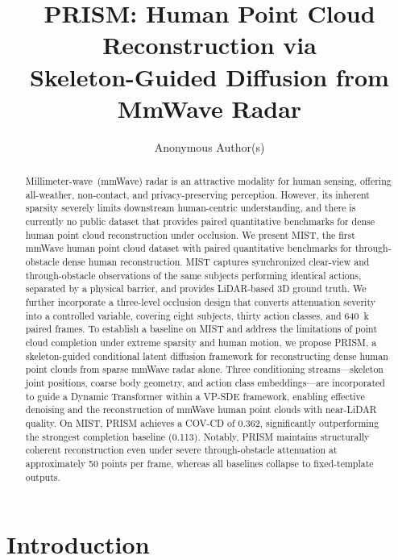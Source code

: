 \documentclass{article}
\title{\textcolor{prismblue}{PRISM}: Human \textcolor{prismblue}{P}oint Cloud \textcolor{prismblue}{R}econstruction v\textcolor{prismblue}{i}a \\
       \textcolor{prismblue}{S}keleton-Guided Diffusion from \textcolor{prismblue}{M}mWave Radar}
\author{Anonymous Author(s)}
\begin{document}
\maketitle

\begin{abstract}
Millimeter-wave~(mmWave) radar is an attractive modality for human sensing, offering
all-weather, non-contact, and privacy-preserving perception. However, its inherent sparsity severely limits downstream human-centric understanding, and there is currently no public dataset that provides paired quantitative benchmarks for dense human point cloud reconstruction under occlusion. We present MIST, the first mmWave human point
cloud dataset with paired quantitative benchmarks for
through-obstacle dense human reconstruction. MIST captures synchronized clear-view and through-obstacle observations of the same subjects performing identical actions, separated by a physical barrier, and provides LiDAR-based 3D ground truth. We further incorporate a three-level occlusion design that converts attenuation severity into a controlled variable, covering eight subjects, thirty action classes, and 640~k paired frames. To establish a baseline on MIST and address the limitations of point
cloud completion under extreme sparsity and human motion, we propose
PRISM, a skeleton-guided conditional latent diffusion framework for reconstructing dense human point clouds from sparse mmWave radar alone. Three conditioning streams—skeleton joint positions, coarse body geometry, and action class embeddings—are incorporated to guide a Dynamic Transformer within a VP-SDE framework, enabling effective denoising and the reconstruction of mmWave human point clouds with near-LiDAR quality. On MIST, PRISM achieves a COV-CD of 0.362, significantly outperforming the strongest completion baseline (0.113). Notably, PRISM maintains structurally coherent reconstruction even under severe through-obstacle attenuation at approximately 50 points per frame, whereas all baselines collapse to fixed-template outputs.
\end{abstract}

\section{Introduction}
\label{sec:intro}
\end{document}
